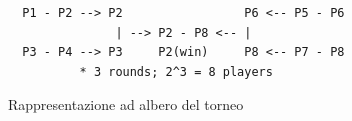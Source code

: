 \begin{figure}[htbp]
\centering
\begin{BVerbatim}
  P1 - P2 --> P2                 P6 <-- P5 - P6
               | --> P2 - P8 <-- |
  P3 - P4 --> P3     P2(win)     P8 <-- P7 - P8
          * 3 rounds; 2^3 = 8 players
\end{BVerbatim}
\caption{Rappresentazione ad albero del torneo}
\label{fig:tournamentBoard}
\end{figure}